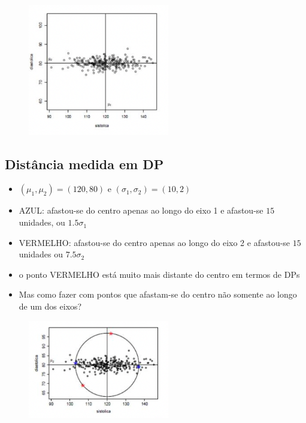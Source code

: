 \documentclass[
  letterpaper,
  DIV=11,
  numbers=noendperiod]{scrartcl}
\providecommand{\tightlist}{%
  \setlength{\itemsep}{0pt}\setlength{\parskip}{0pt}}\usepackage{longtable,booktabs,array}
\begin{document}
\begin{figure}

{\centering \includegraphics[width=0.55\textwidth,height=\textheight]{figs/Aula07/pressao2.png}

}

\end{figure}

\hypertarget{distuxe2ncia-medida-em-dp}{%
\subsection{Distância medida em DP}\label{distuxe2ncia-medida-em-dp}}

\begin{itemize}
\tightlist
\item
  \((\mu_1,\mu_2) = (120,80)\) e \((\sigma_1, \sigma_2) = (10,2)\)
\item
  AZUL: afastou-se do centro apenas ao longo do eixo 1 e afastou-se
  \(15\) unidades, ou \(1.5\sigma_1\)
\item
  VERMELHO: afastou-se do centro apenas ao longo do eixo 2 e afastou-se
  \(15\) unidades ou \(7.5\sigma_2\)
\item
  o ponto VERMELHO está muito mais distante do centro em termos de DPs
\item
  Mas como fazer com pontos que afastam-se do centro não somente ao
  longo de um dos eixos?
\end{itemize}

\begin{figure}

{\centering \includegraphics[width=0.55\textwidth,height=\textheight]{figs/Aula07/distancia_centro.png}

}

\end{figure}
\end{document}
